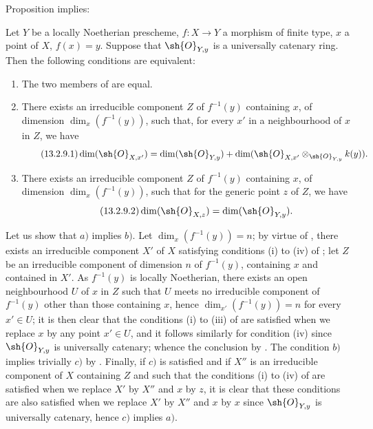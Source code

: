 Proposition  implies:

\begin{corollary}[13.2.9]
\label{IV.13.2.9}
Let $Y$ be a locally Noetherian prescheme, $f:X\to Y$ a morphism of finite type, $x$ a point of $X$, $f(x)=y$.
Suppose that $\sh{O}_{Y,y}$ is a universally catenary ring.
Then the following conditions are equivalent:
\begin{enumerate}[label=\emph{\alph*)}]
  \item The two members of  are equal.
  \item There exists an irreducible component $Z$ of $f^{-1}(y)$ containing $x$, of dimension $\dim_x(f^{-1}(y))$, such that, for every $x'$ in a neighbourhood of $x$ in $Z$, we have
  \[
  \label{IV.13.2.9.1}
\tag{13.2.9.1}
    \dim(\sh{O}_{X,x'})=\dim(\sh{O}_{Y,y})+\dim(\sh{O}_{X,x'}\otimes_{\sh{O}_{Y,y}}k(y)).
  \]
  \item There exists an irreducible component $Z$ of $f^{-1}(y)$ containing $x$, of dimension $\dim_x(f^{-1}(y))$, such that for the generic point $z$ of $Z$, we have
  \[
  \label{IV.13.2.9.2}
\tag{13.2.9.2}
    \dim(\sh{O}_{X,z})=\dim(\sh{O}_{Y,y}).
  \]
\end{enumerate}
\end{corollary}

Let us show that $a)$ implies $b)$.
Let $\dim_x(f^{-1}(y))=n$; by virtue of , there exists an irreducible component $X'$ of $X$ satisfying conditions (i) to (iv) of ; let $Z$ be an irreducible component of dimension $n$ of $f^{-1}(y)$, containing $x$ and contained in $X'$.
As $f^{-1}(y)$ is locally Noetherian, there exists an open neighbourhood $U$ of $x$ in $Z$ such that $U$ meets no irreducible component of $f^{-1}(y)$ other than those containing $x$, hence  $\dim_{x'}(f^{-1}(y))=n$ for every $x'\in U$; it is then clear that the conditions (i) to (iii) of  are satisfied when we replace $x$ by any point $x'\in U$, and it follows similarly for condition (iv) since $\sh{O}_{Y,y}$ is universally catenary; whence the conclusion by .
The condition $b)$ implies trivially $c)$ by .
Finally, if $c)$ is satisfied and if $X''$ is an irreducible component of $X$ containing $Z$ and such that the conditions (i) to (iv) of  are satisfied when we replace $X'$ by $X''$ and $x$ by $z$, it is clear that these conditions are also satisfied when we replace $X'$ by $X''$ and $x$ by $x$ since $\sh{O}_{Y,y}$ is universally catenary, hence $c)$ implies $a)$.

